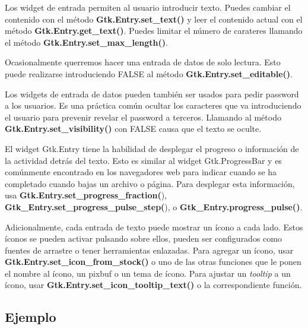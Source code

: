 \documentclass[12pt, twoside]{report}
\begin{document}
Los widget de entrada permiten al usuario introducir texto. Puedes cambiar el contenido con el método \textbf{Gtk.Entry.set\_text()} y leer el contenido actual con el método \textbf{Gtk.Entry.get\_text()}. Puedes limitar el número de carateres llamando el método \textbf{Gtk.Entry.set\_max\_length()}.

Ocasionalmente querremos hacer una entrada de datos de solo lectura. Esto puede realizarse introduciendo FALSE al método \textbf{Gtk.Entry.set\_editable()}.

Los widgets de entrada de datos pueden también ser usados para pedir password a los usuarios. Es una práctica común ocultar los caracteres que va introduciendo el usuario para prevenir revelar el password a terceros. Llamando al método \textbf{Gtk.Entry.set\_visibility()} con FALSE causa que el texto se oculte.


El widget Gtk.Entry tiene la habilidad de desplegar el progreso o información de la actividad detrás del texto. Esto es similar al widget Gtk.ProgressBar y es comúnmente encontrado en los navegadores web para indicar cuando se ha completado cuando bajas un archivo o página. Para desplegar esta información, usa \textbf{Gtk.Entry.set\_progress\_fraction(}), \textbf{Gtk\_Entry.set\_progress\_pulse\_step(}), o\textbf{ Gtk\_Entry.progress\_pulse()}.

Adicionalmente, cada entrada de texto puede mostrar un ícono a cada lado. Estos íconos se pueden activar pulsando sobre ellos, pueden ser configurados como fuentes de arrastre o tener herramientas enlazadas. Para agregar un ícono, usar \textbf{Gtk.Entry.set\_icon\_from\_stock()} o uno de las otras funciones que le ponen el nombre al ícono, un pixbuf o un tema de ícono. Para ajustar un\textit{ tooltip} a un ícono, usar \textbf{Gtk.Entry.set\_icon\_tooltip\_text()} o la correspondiente función. 

\subsection{Ejemplo}
\end{document}
